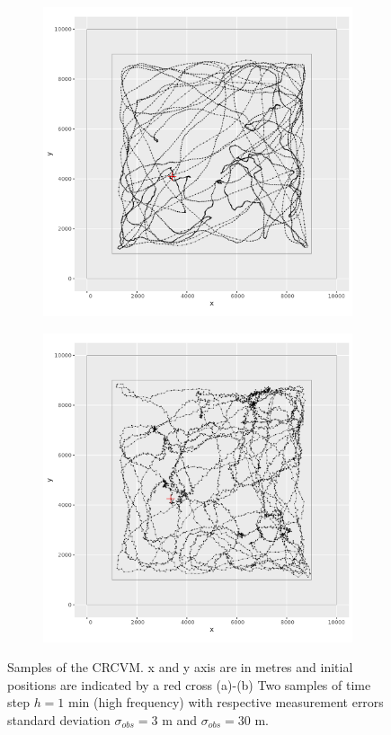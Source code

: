 \documentclass[11pt]{article}
\newcommand {\1}{\mathbb{1}}
\begin{document}
\begin{figure}[H]
	\centering
	\begin{subfigure}{0.48\textwidth}
		\centering
		\includegraphics[scale=0.4]{images/simulation study/samples_rect_hf_ne_omega.png}
		\caption{}
	\end{subfigure}
	\begin{subfigure}{0.48\textwidth}
		\centering
		\includegraphics[scale=0.4]{images/simulation study/samples_rect_hf_e_omega.png}
		\caption{}
	\end{subfigure}
	\caption{Samples of the CRCVM. x and y axis are in metres and initial positions are indicated by a red cross (a)-(b) Two samples of time step $h=1$ min (high frequency) with respective measurement errors standard deviation $\sigma_{obs}=3$ m and $\sigma_{obs}=30$ m.}
	\label{fig: samples_rect_CRCVM}
\end{figure}
\end{document}
